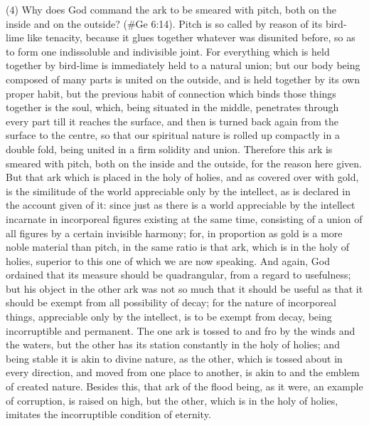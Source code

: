 (4) Why does God command the ark to be smeared with pitch, both on the inside and on the
outside? (\#Ge 6:14). Pitch is so called by reason of its bird-lime like tenacity, because it glues
together whatever was disunited before, so as to form one indissoluble and indivisible joint. For
everything which is held together by bird-lime is immediately held to a natural union; but our body
being composed of many parts is united on the outside, and is held together by its own proper
habit, but the previous habit of connection which binds those things together is the soul, which,
being situated in the middle, penetrates through every part till it reaches the surface, and then is
turned back again from the surface to the centre, so that our spiritual nature is rolled up compactly
in a double fold, being united in a firm solidity and union. Therefore this ark is smeared with pitch,
both on the inside and the outside, for the reason here given. But that ark which is placed in the
holy of holies, and as covered over with gold, is the similitude of the world appreciable only by the
intellect, as is declared in the account given of it: since just as there is a world appreciable by the
intellect incarnate in incorporeal figures existing at the same time, consisting of a union of all
figures by a certain invisible harmony; for, in proportion as gold is a more noble material than pitch,
in the same ratio is that ark, which is in the holy of holies, superior to this one of which we are now
speaking. And again, God ordained that its measure should be quadrangular, from a regard to
usefulness; but his object in the other ark was not so much that it should be useful as that it should
be exempt from all possibility of decay; for the nature of incorporeal things, appreciable only by the
intellect, is to be exempt from decay, being incorruptible and permanent. The one ark is tossed to
and fro by the winds and the waters, but the other has its station constantly in the holy of holies;
and being stable it is akin to divine nature, as the other, which is tossed about in every direction,
and moved from one place to another, is akin to and the emblem of created nature. Besides this,
that ark of the flood being, as it were, an example of corruption, is raised on high, but the other,
which is in the holy of holies, imitates the incorruptible condition of eternity.

